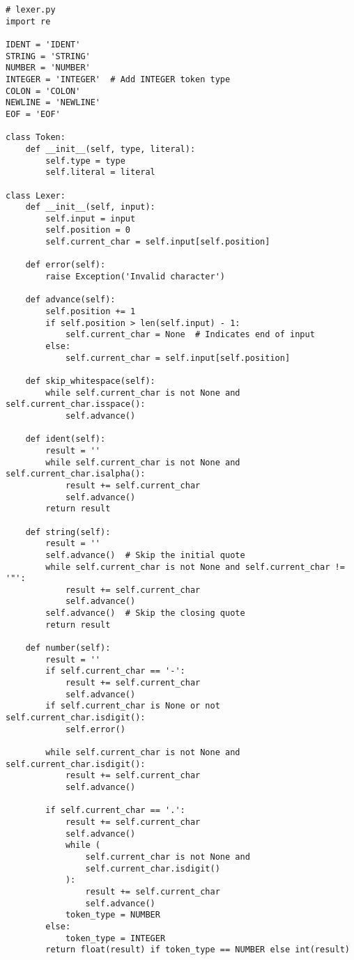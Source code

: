 \begin{lstlisting}
# lexer.py
import re

IDENT = 'IDENT'
STRING = 'STRING'
NUMBER = 'NUMBER'
INTEGER = 'INTEGER'  # Add INTEGER token type
COLON = 'COLON'
NEWLINE = 'NEWLINE'
EOF = 'EOF'

class Token:
    def __init__(self, type, literal):
        self.type = type
        self.literal = literal

class Lexer:
    def __init__(self, input):
        self.input = input
        self.position = 0
        self.current_char = self.input[self.position]

    def error(self):
        raise Exception('Invalid character')

    def advance(self):
        self.position += 1
        if self.position > len(self.input) - 1:
            self.current_char = None  # Indicates end of input
        else:
            self.current_char = self.input[self.position]

    def skip_whitespace(self):
        while self.current_char is not None and self.current_char.isspace():
            self.advance()

    def ident(self):
        result = ''
        while self.current_char is not None and self.current_char.isalpha():
            result += self.current_char
            self.advance()
        return result

    def string(self):
        result = ''
        self.advance()  # Skip the initial quote
        while self.current_char is not None and self.current_char != '"':
            result += self.current_char
            self.advance()
        self.advance()  # Skip the closing quote
        return result

    def number(self):
        result = ''
        if self.current_char == '-':
            result += self.current_char
            self.advance()
        if self.current_char is None or not self.current_char.isdigit():
            self.error()

        while self.current_char is not None and self.current_char.isdigit():
            result += self.current_char
            self.advance()

        if self.current_char == '.':
            result += self.current_char
            self.advance()
            while (
                self.current_char is not None and
                self.current_char.isdigit()
            ):
                result += self.current_char
                self.advance()
            token_type = NUMBER
        else:
            token_type = INTEGER
        return float(result) if token_type == NUMBER else int(result)


\end{lstlisting}
